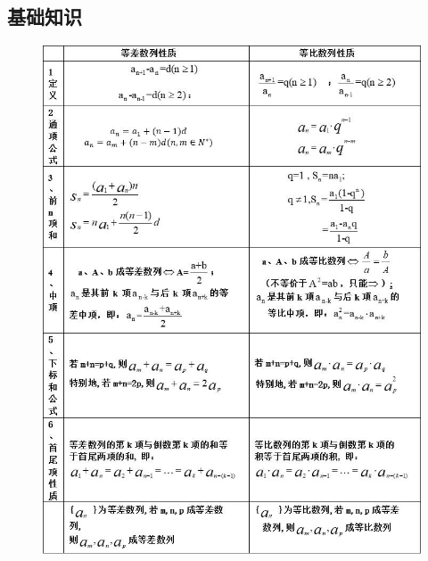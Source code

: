 \documentclass[hyperref, UTF8,11pt,a4paper]{ctexart} %
\begin{document}
\subsection{基础知识}
\begin{figure}[!h] %
	\centering
	\includegraphics[width=450pt]  {pic/shulie/shuliexingzhi1.jpg} \\
\end{figure}
\end{document}
